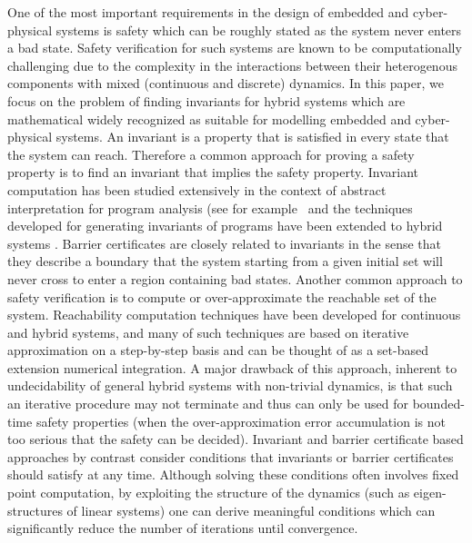 One of the most important requirements in the design of embedded and cyber-physical systems is safety which can be roughly stated as the system never enters a bad state. Safety verification for such systems are known to be computationally challenging due to the complexity in the interactions between their heterogenous components with mixed (continuous and discrete) dynamics. In this paper, we focus on the problem of finding invariants for hybrid systems which are mathematical widely recognized as suitable for modelling embedded and cyber-physical systems. An invariant is a property that is satisfied in every state that the system can reach. 
Therefore a common approach for proving a safety property is to find an invariant that implies the safety property. Invariant computation has been studied extensively in the context of abstract interpretation for program analysis (see for example~\cite{CousotCousot76-1,CousotHalbwachs1978,Bensalem2000,Tiwari2001,SriramSipma2004,colonSriramSipma2003,Fluctuat} and the techniques developed for generating invariants of programs have been extended to hybrid systems \cite{Sriram,Jeannet,tiwariRodriguezCarbonellPolynomialInvariants,Goubault,HybridFluctuat,differentialInvariantPlatzer,Gawlitza}. Barrier certificates \cite{prajna2004safety} are closely related to invariants in the sense that they describe a boundary that the system starting from a given initial set will never cross to enter a region containing bad states. Another common approach to safety verification is to compute or over-approximate the reachable set of the system. Reachability computation techniques have been developed for continuous and hybrid systems, and many of such techniques are based on iterative approximation on a step-by-step basis and can be thought of as a set-based extension numerical integration. A major drawback of this approach, inherent to undecidability of general hybrid systems with non-trivial dynamics, is that such an iterative procedure may not terminate and thus can only be used for bounded-time safety properties (when the over-approximation error accumulation is not too serious that the safety can be decided). Invariant and barrier certificate based approaches by contrast consider conditions that invariants or barrier certificates should satisfy at any time. Although solving these conditions often involves fixed point computation, by exploiting the structure of the dynamics (such as eigen-structures of linear systems) one can derive meaningful conditions which can significantly reduce the number of iterations until convergence.

